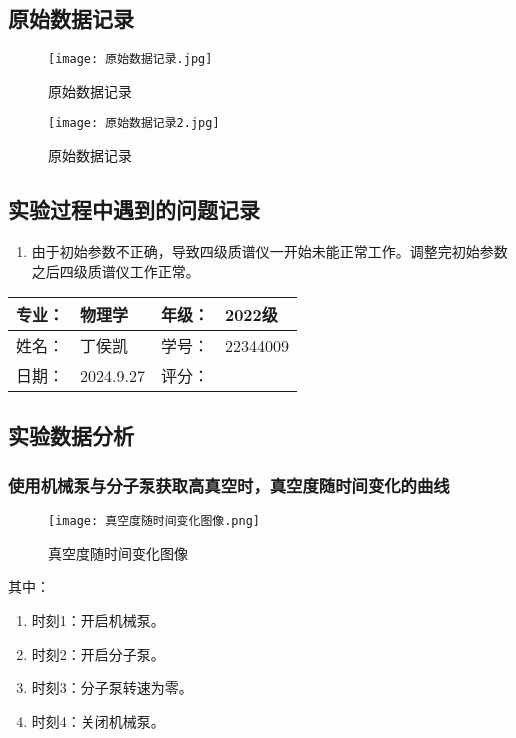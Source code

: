\documentclass[dvipsnames, svgnames,a4paper,11pt]{article}
\begin{document}
\clearpage

\subsection{原始数据记录}
\begin{figure}[htbp]
	\centering
	\texttt{[image: 原始数据记录.jpg]}
	\caption{原始数据记录}
	\label{fig:原始数据记录}
\end{figure}

\begin{figure}[htbp]
	\centering
	\texttt{[image: 原始数据记录2.jpg]}
	\caption{原始数据记录}
	\label{fig:原始数据记录2}
\end{figure}

\clearpage
\subsection{实验过程中遇到的问题记录}
	\begin{enumerate}
		\item 由于初始参数不正确，导致四级质谱仪一开始未能正常工作。调整完初始参数之后四级质谱仪工作正常。
	\end{enumerate}






\clearpage
\begin{table}
	\renewcommand\arraystretch{1.7}
	\begin{tabularx}{\textwidth}{|X|X|X|X|}
	\hline
	专业：& 物理学 &年级：& 2022级\\
	\hline
	姓名： &丁侯凯 & 学号：&22344009 \\
	\hline
    日期：& 2024.9.27& 评分： &\\
	\hline
	\end{tabularx}
\end{table}

\subsection{实验数据分析}
	\subsubsection{使用机械泵与分子泵获取高真空时，真空度随时间变化的曲线}
	\begin{figure}[htbp]
		\centering
		\texttt{[image: 真空度随时间变化图像.png]}
		\caption{真空度随时间变化图像}
		\label{fig:真空度随时间变化图像}
	\end{figure}
	其中：
	\begin{enumerate}
		\item 时刻1：开启机械泵。
		\item 时刻2：开启分子泵。
		\item 时刻3：分子泵转速为零。
		\item 时刻4：关闭机械泵。
	\end{enumerate}
\end{document}
